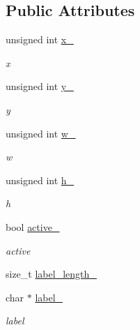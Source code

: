 \subsection*{Public Attributes}
\begin{DoxyCompactItemize}
\item 
unsigned int \hyperlink{classnebula_1_1ui_1_1object_1_1base_ae86e01905bfd8aef693daeed01adef19}{x\_\-}
\begin{DoxyCompactList}\small\item\em x \item\end{DoxyCompactList}\item 
unsigned int \hyperlink{classnebula_1_1ui_1_1object_1_1base_abadc855d8c507cf94d6518e798e440bc}{y\_\-}
\begin{DoxyCompactList}\small\item\em y \item\end{DoxyCompactList}\item 
unsigned int \hyperlink{classnebula_1_1ui_1_1object_1_1base_a11808daa2f1de6fb4eead60b5471620a}{w\_\-}
\begin{DoxyCompactList}\small\item\em w \item\end{DoxyCompactList}\item 
unsigned int \hyperlink{classnebula_1_1ui_1_1object_1_1base_a9f52327e70342132d782504288b650bf}{h\_\-}
\begin{DoxyCompactList}\small\item\em h \item\end{DoxyCompactList}\item 
bool \hyperlink{classnebula_1_1ui_1_1object_1_1base_a33adf260d90d85672d531daa45231973}{active\_\-}
\begin{DoxyCompactList}\small\item\em active \item\end{DoxyCompactList}\item 
size\_\-t \hyperlink{classnebula_1_1ui_1_1object_1_1base_a8e12b29537ceda092423078dcd031e3c}{label\_\-length\_\-}
\item 
char $\ast$ \hyperlink{classnebula_1_1ui_1_1object_1_1base_addbea819eadf0212036dfa7d8565f06d}{label\_\-}
\begin{DoxyCompactList}\small\item\em label \item\end{DoxyCompactList}\end{DoxyCompactItemize}
